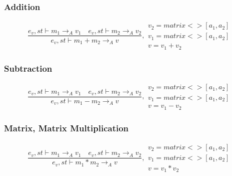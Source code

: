 \subsubsection{Addition}
\begin{equation}
	\frac { { e }_{ v },st\vdash { m }_{ 1 }{ \rightarrow  }_{ A }{ v }_{ 1 }\quad { e }_{ v },st\vdash { m }_{ 2 }{ \rightarrow  }_{ A }{ v }_{ 2 } }{ { e }_{ v },st\vdash { m }_{ 1 }+{ m }_{ 2 }{ \rightarrow  }_{ A }{ v } } ,\begin{matrix} { v }_{ 2 }=matrix<>[{ a }_{ 1 },{ a }_{ 2 }] \\ { v }_{ 1 }=matrix<>[{ a }_{ 1 },{ a }_{ 2 }] \\ v={ v }_{ 1 }+{ v }_{ 2 } \end{matrix}
\end{equation}


\subsubsection{Subtraction}
\begin{equation}
	\frac { { e }_{ v },st\vdash { m }_{ 1 }{ \rightarrow  }_{ A }{ v }_{ 1 }\quad { e }_{ v },st\vdash { m }_{ 2 }{ \rightarrow  }_{ A }{ v }_{ 2 } }{ { e }_{ v },st\vdash { m }_{ 1 }-{ m }_{ 2 }{ \rightarrow  }_{ A }{ v } } ,\begin{matrix} { v }_{ 2 }=matrix<>[{ a }_{ 1 },{ a }_{ 2 }] \\ { v }_{ 1 }=matrix<>[{ a }_{ 1 },{ a }_{ 2 }] \\ v={ v }_{ 1 }-{ v }_{ 2 } \end{matrix}
\end{equation}


\subsubsection{Matrix, Matrix Multiplication}
\begin{equation}
	\frac { { e }_{ v },st\vdash { m }_{ 1 }{ \rightarrow  }_{ A }{ v }_{ 1 }\quad { e }_{ v },st\vdash { m }_{ 2 }{ \rightarrow  }_{ A }{ v }_{ 2 } }{ { e }_{ v },st\vdash { m }_{ 1 }\ast { m }_{ 2 }{ \rightarrow  }_{ A }{ v } } ,\begin{matrix} { v }_{ 2 }=matrix<>[{ a }_{ 1 },{ a }_{ 2 }] \\ { v }_{ 1 }=matrix<>[{ a }_{ 1 },{ a }_{ 2 }] \\ v={ v }_{ 1 }*{ v }_{ 2 } \end{matrix}
\end{equation}

